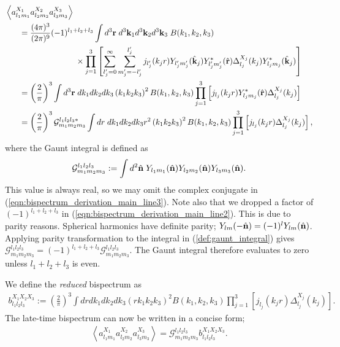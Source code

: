 \begin{align}
	&\left< a_{l_1 m_1}^{X_1} a_{l_2 m_2}^{X_2} a_{l_3 m_3}^{X_3}  \right> \nonumber \\
	&\hspace{0.05\textwidth}= \frac{(4\pi)^3}{(2\pi)^9} (-1)^{l_1 + l_2 + l_3} \int d^3 \vv{r} \; d^3 \vv{k}_1 d^3 \vv{k}_2 d^3 \vv{k}_3 \; B(k_1,k_2,k_3) \nonumber \\
	&\hspace{0.25\textwidth} \times \prod_{j=1}^{3} \left[ \sum_{l'_j = 0}^{\infty} \sum_{m'_j=-l'_j}^{l'_j} j_{l'_j} (k_j r) Y_{l'_j m'_j} (\hat{\vv{k}}_j) Y^*_{l'_j m'_j} (\hat{\vv{r}}) \Delta_{l_j}^{X_j} (k_j) Y^*_{l_j m_j} (\hat{\vv{k}}_j) \right]  \label{eqn:bispectrum_derivation_main_line1}\\
	&\hspace{0.05\textwidth}= \left( \frac{2}{\pi} \right)^3 \int d^3 \vv{r} \; dk_1 dk_2 dk_3 \left( k_1 k_2 k_3 \right)^2 B(k_1, k_2, k_3) \prod_{j=1}^{3} \left[ j_{l_j} (k_j r) Y^*_{l_j m_j} (\hat{\vv{r}}) \Delta_{l_j}^{X_j} (k_j) \right]  \label{eqn:bispectrum_derivation_main_line2}\\
	&\hspace{0.05\textwidth}= \left( \frac{2}{\pi} \right)^3 \mathcal{G}^{l_1 l_2 l_3 *}_{m_1 m_2 m_3} \int dr \; dk_1 dk_2 dk_3 r^2 \left( k_1 k_2 k_3 \right)^2 B(k_1, k_2, k_3) \prod_{j=1}^{3} \left[ j_{l_j} (k_j r) \Delta_{l_j}^{X_j} (k_j) \right], \label{eqn:bispectrum_derivation_main_line3}
\end{align}
where the Gaunt integral is defined as
\begin{align}
	\mathcal{G}^{l_1 l_2 l_3}_{m_1 m_2 m_3} := \int d^2 \hat{\mathbf{n}} \; Y_{l_1 m_1} (\hat{\mathbf{n}}) Y_{l_2 m_2} (\hat{\mathbf{n}}) Y_{l_3 m_3} (\hat{\mathbf{n}}). \label{def:gaunt_integral}
\end{align}
This value is always real, so we may omit the complex conjugate in (\ref{eqn:bispectrum_derivation_main_line3}). Note also that we dropped a factor of $(-1)^{l_1+l_2+l_3}$ in (\ref{eqn:bispectrum_derivation_main_line2}). This is due to parity reasons. Spherical harmonics have definite parity; $Y_{lm}(-\hat{\mathbf{n}}) = (-1)^l Y_{lm}(\hat{\mathbf{n}})$. Applying parity transformation to the integral in (\ref{def:gaunt_integral}) gives $\mathcal{G}^{l_1 l_2 l_3}_{m_1 m_2 m_3} = (-1)^{l_1+l_2+l_3} \mathcal{G}^{l_1 l_2 l_3}_{m_1 m_2 m_3}$. The Gaunt integral therefore evaluates to zero unless $l_1+l_2+l_3$ is even.

We define the \textit{reduced} bispectrum as
\begin{align}
	b^{X_1 X_2 X_3}_{l_1 l_2 l_3} := \left( \frac{2}{\pi} \right)^3 \int dr dk_1 dk_2 dk_3 \left(r k_1 k_2 k_3 \right)^2 B(k_1, k_2, k_3) \prod_{j=1}^{3} \left[ j_{l_j} (k_j r) \Delta_{l_j}^{X_j} (k_j) \right]. \label{def:reduced_bispectrum}
\end{align}
The late-time bispectrum can now be written in a concise form;
\begin{align}
	\left< a_{l_1 m_1}^{X_1} a_{l_2 m_2}^{X_2} a_{l_3 m_3}^{X_3}  \right> = \mathcal{G}^{l_1 l_2 l_3}_{m_1 m_2 m_3} b^{X_1 X_2 X_3}_{l_1 l_2 l_3}. \label{eqn:late_time_bispectrum_form}
\end{align}

